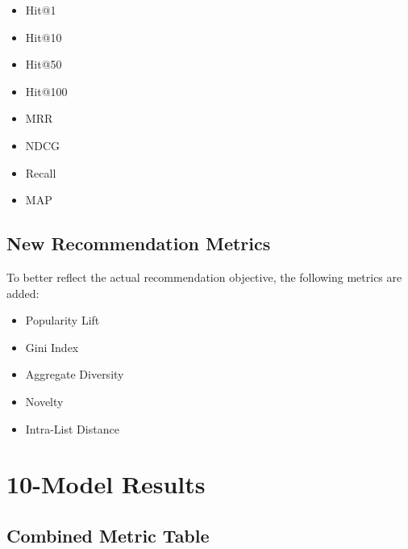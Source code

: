 \documentclass[11pt,a4paper]{article}
\begin{document}
\begin{itemize}
    \item Hit@1
    \item Hit@10
    \item Hit@50
    \item Hit@100
    \item MRR
    \item NDCG
    \item Recall
    \item MAP
\end{itemize}

\subsection{New Recommendation Metrics}
To better reflect the actual recommendation objective, the following metrics are
added:

\begin{itemize}
    \item Popularity Lift
    \item Gini Index
    \item Aggregate Diversity
    \item Novelty
    \item Intra-List Distance
\end{itemize}

\section{10-Model Results}

\subsection{Combined Metric Table}
\end{document}
